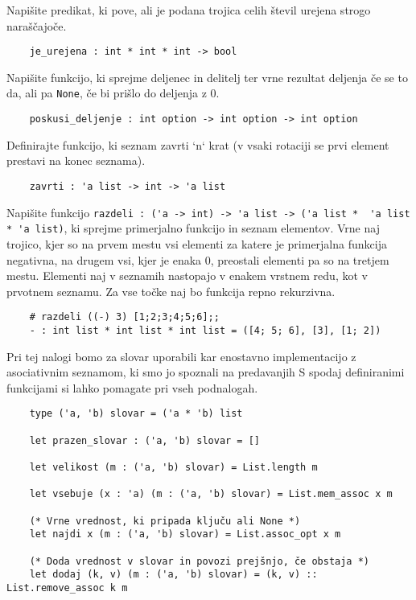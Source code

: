\documentclass[arhiv]{../izpit}
\begin{document}
	
	

	\naloga 
  
	\podnaloga Napišite predikat, ki pove, ali je podana trojica celih števil urejena strogo naraščajoče.
  \begin{verbatim}
    je_urejena : int * int * int -> bool
  \end{verbatim}

  \podnaloga Napišite funkcijo, ki sprejme deljenec in delitelj ter vrne rezultat deljenja če se to da, ali pa \verb|None|, če bi prišlo do deljenja z 0. 
  \begin{verbatim}
    poskusi_deljenje : int option -> int option -> int option
  \end{verbatim}

  \podnaloga Definirajte funkcijo, ki seznam zavrti `n` krat (v vsaki rotaciji se prvi element prestavi na konec seznama).
  \begin{verbatim}
    zavrti : 'a list -> int -> 'a list
  \end{verbatim}
	
  \podnaloga Napišite funkcijo \verb|razdeli : ('a -> int) -> 'a list -> ('a list *  'a list * 'a list)|, ki sprejme primerjalno funkcijo in seznam elementov. Vrne naj trojico, kjer so na prvem mestu vsi elementi za katere je primerjalna funkcija negativna, na drugem vsi, kjer je enaka 0, preostali elementi pa so na tretjem mestu. 
  Elementi naj v seznamih nastopajo v enakem vrstnem redu, kot v prvotnem seznamu. Za vse točke naj bo funkcija repno rekurzivna.
  \begin{verbatim}
    # razdeli ((-) 3) [1;2;3;4;5;6];;
    - : int list * int list * int list = ([4; 5; 6], [3], [1; 2])
  \end{verbatim}

  \naloga
  
  Pri tej nalogi bomo za slovar uporabili kar enostavno implementacijo z asociativnim seznamom, ki smo jo spoznali na predavanjih 
  S spodaj definiranimi funkcijami si lahko pomagate pri vseh podnalogah.
  
\begin{verbatim}
    type ('a, 'b) slovar = ('a * 'b) list

    let prazen_slovar : ('a, 'b) slovar = []
    
    let velikost (m : ('a, 'b) slovar) = List.length m
    
    let vsebuje (x : 'a) (m : ('a, 'b) slovar) = List.mem_assoc x m
    
    (* Vrne vrednost, ki pripada ključu ali None *)
    let najdi x (m : ('a, 'b) slovar) = List.assoc_opt x m
    
    (* Doda vrednost v slovar in povozi prejšnjo, če obstaja *)
    let dodaj (k, v) (m : ('a, 'b) slovar) = (k, v) :: List.remove_assoc k m
\end{verbatim}
  
\end{document}
